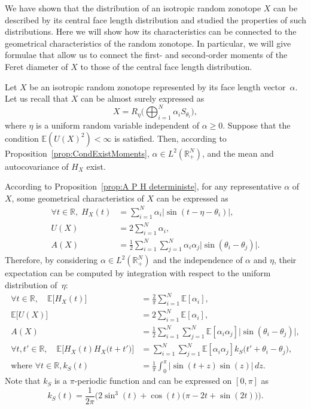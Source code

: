 \documentclass[numbers,compress,v1.0.1]{vmsta}
\theoremstyle{definition}
\begin{document}
We have shown that the distribution of an isotropic random zonotope
$X$ can be described by its central face length distribution and
studied the properties of such distributions. Here we will show how its
characteristics can be connected to the geometrical characteristics of
the random zonotope. In particular, we will give formulae that allow us
to connect the first- and second-order moments of the Feret diameter of
$X$ to those of the central face length distribution.

Let $X$ be an isotropic random zonotope represented by its face length
vector~$\alpha$. Let us recall that $X$ can be almost surely expressed as
%
\begin{equation*}
X=R_{\eta}\Biggl(\bigoplus_{i=1}^N
\alpha_i S_{\theta_i}\Biggr),
\end{equation*}
%
where $\eta$ is a uniform random variable independent of $\alpha\geq
0$. Suppose that the condition $\mathbb{E}(U(X)^2)<\infty$ is
satisfied. Then, according to Proposition~\ref{prop:CondExistMoments},
$\alpha\in L^2(\mathbb{R}_+^N)$, and the mean and autocovariance of
$H_{X}$ exist.

According to Proposition~\ref{prop:A P H deterministe}, for any
representative $\alpha$ of $X$, some geometrical characteristics of $X$
can be expressed as
%
\begin{align*}
\forall t\in\mathbb{R},\; H_{X}(t)&=\sum_{i=1}^N\alpha_i\bigl\vert\sin (t-\eta-\theta_i )\bigr\vert,\\
U(X)&=2\sum_{i=1}^N \alpha_i,\\
A(X)&=\frac{1}{2}\sum_{i=1}^N \sum_{j=1}^N\alpha_i\alpha_j\bigl\vert\sin (\theta_i-\theta_j)\bigr\vert.
\end{align*}
%
Therefore, by considering $\alpha\in L^2(\mathbb{R}_+^N)$ and the
independence of $\alpha$ and $\eta$, their expectation can be computed
by integration with respect to the uniform distribution of~$\eta$:
%
\begin{align}
\forall t\in\mathbb{R},\quad \mathbb{E}\bigl[ H_{X}(t)\bigr]&=\frac{2}{\pi}\sum_{i=1}^N \mathbb{E}[\alpha_i], \label{eq:espFeretModel}\\
\mathbb{E}\bigl[ U(X)\bigr]&=2\sum_{i=1}^N\mathbb{E}[ \alpha_i],\\
A(X)&=\frac{1}{2}\sum_{i=1}^N \sum_{j=1}^N\mathbb{E}[ \alpha_i\alpha _j]\bigl\vert\sin(\theta_i-\theta_j)\bigr\vert,\label{eq:espAreaIsotropicregZonotope}\\
\forall t,t'\in\mathbb{R},\quad \mathbb{E}\bigl[ H_{X}(t)H_{X}\bigl(t+t'\bigr)\bigr]&=\sum_{i=1}^N\sum_{j=1}^N\mathbb{E}[ \alpha_i\alpha_j]k_S\bigl(t'+\theta_i -\theta_j\bigr),\label{eq:HHIsotropicregZonotope}\\
\text{where } \forall t\in\mathbb{R},k_S(t)&=\frac{1}{\pi}\int_0^\pi \bigl\vert\sin(t+z)\sin(z)\bigr\vert \,dz.
\end{align}
%
Note that $k_S$ is a $\pi$-periodic function and can be expressed on
$[0,\pi]$ as
%
\begin{equation}
k_S(t)=\frac{1}{2\pi}\bigl(2\sin^3(t)+\cos(t)
\bigl(\pi-2t+\sin(2t)\bigr)\bigr). \label{eq:exppression_k_s}
\end{equation}
\end{document}
